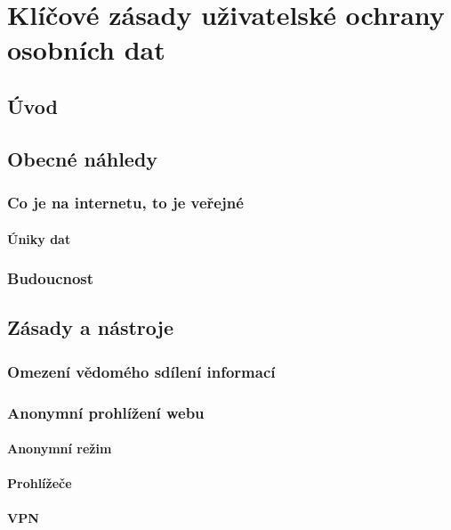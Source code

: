 \chapter{Klíčové zásady uživatelské ochrany osobních dat}

\section*{Úvod}

\section{Obecné náhledy}

\subsection{Co je na internetu, to je veřejné}
\subsubsection*{Úniky dat}

\subsection{Budoucnost}

\section{Zásady a nástroje}

\subsection{Omezení vědomého sdílení informací}

\subsection{Anonymní prohlížení webu}
\subsubsection*{Anonymní režim}
\subsubsection*{Prohlížeče}
\subsubsection*{VPN}
